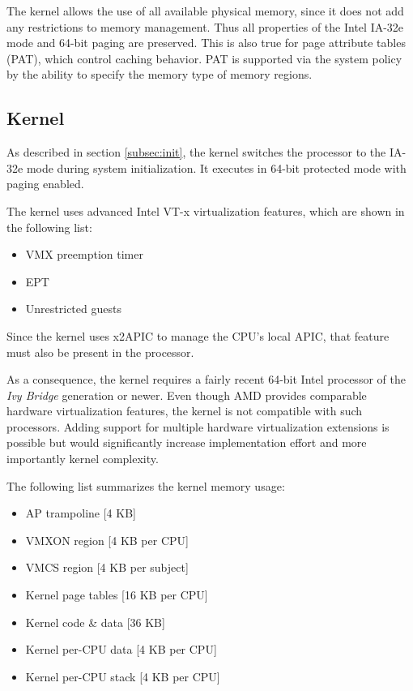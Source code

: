 The kernel allows the use of all available physical memory, since it does not
add any restrictions to memory management. Thus all properties of the Intel
IA-32e mode and 64-bit paging are preserved. This is also true for page
attribute tables (PAT), which control caching behavior. PAT is supported via the
system policy by the ability to specify the memory type of memory regions.

\subsection{Kernel}
As described in section \ref{subsec:init}, the kernel switches the processor to
the IA-32e mode during system initialization. It executes in 64-bit protected
mode with paging enabled.

The kernel uses advanced Intel VT-x virtualization features, which are shown in
the following list:

\begin{itemize}
	\item VMX preemption timer
	\item EPT
	\item Unrestricted guests
\end{itemize}

Since the kernel uses x2APIC to manage the CPU's local APIC, that feature must
also be present in the processor.

As a consequence, the kernel requires a fairly recent 64-bit Intel processor of
the \emph{Ivy Bridge} generation or newer. Even though AMD provides comparable
hardware virtualization features, the kernel is not compatible with such
processors. Adding support for multiple hardware virtualization extensions is
possible but would significantly increase implementation effort and more
importantly kernel complexity.

The following list summarizes the kernel memory usage:

\begin{itemize}
	\item AP trampoline [4 KB]
	\item VMXON region [4 KB per CPU]
	\item VMCS region [4 KB per subject]
	\item Kernel page tables [16 KB per CPU]
	\item Kernel code \& data [36 KB]
	\item Kernel per-CPU data  [4 KB per CPU]
	\item Kernel per-CPU stack [4 KB per CPU]
\end{itemize}

